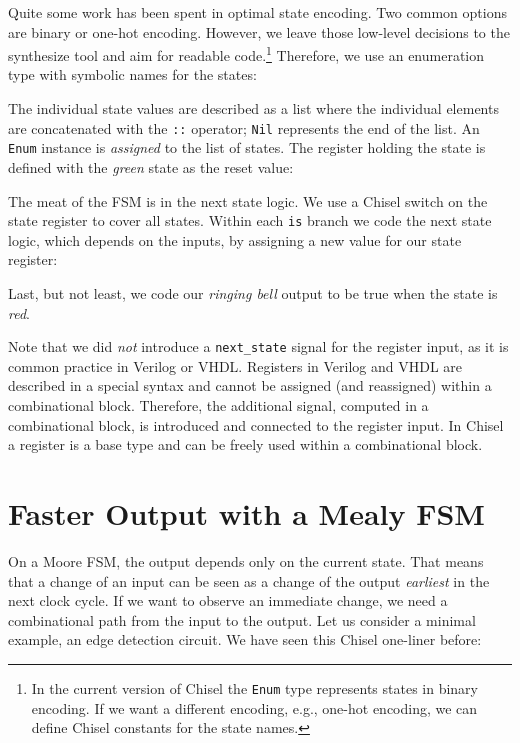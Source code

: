 \documentclass[%
    10pt,
    headinclude, footexclude,
    openright, %
    notitlepage,
    cleardoubleempty,
    headsepline,
    pointlessnumbers,
    bibtotoc, idxtotoc,
    ]{scrbook}
\newcommand{\code}[1]{{\small{\texttt{#1}}}}
\begin{document}
\noindent Quite some work has been spent in optimal state encoding. Two common options
are binary or one-hot encoding. However, we leave those low-level decisions to
the synthesize tool and aim for readable code.\footnote{In the current version
of Chisel the \code{Enum} type represents states in binary encoding.
If we want a different encoding, e.g., one-hot encoding, we can define Chisel
constants for the state names.}
Therefore, we use an enumeration type with symbolic names for the states:


\noindent The individual state values are described as a list where the individual
elements are concatenated with the \code{::} operator; \code{Nil} represents
the end of the list. An \code{Enum} instance is \emph{assigned} to the list of states.
The register holding the state is defined with the \emph{green} state as the reset value:


\noindent The meat of the FSM is in the next state logic. We use a Chisel switch on the
state register to cover all states. Within each \code{is} branch we code the next state
logic, which depends on the inputs, by assigning a new value for our state register:


\noindent Last, but not least, we code our \emph{ringing bell} output to be true when
the state is \emph{red}.


Note that we did \emph{not} introduce a \code{next\_state} signal for the register input,
as it is common practice in Verilog or VHDL.
Registers in Verilog and VHDL are described in a special syntax and cannot
be assigned (and reassigned) within a combinational block.
Therefore, the additional signal, computed in a combinational block, is
introduced and connected to the register input.
In Chisel a register is a base type and can be freely used within a combinational block.

\section{Faster Output with a Mealy FSM}

On a Moore FSM, the output depends only on the current state.
That means that a change of an input can be seen as a change of the
output \emph{earliest} in the next clock cycle.
If we want to observe an immediate change, we need a combinational
path from the input to the output.
Let us consider a minimal example, an edge detection circuit.
We have seen this Chisel one-liner before:
\end{document}
